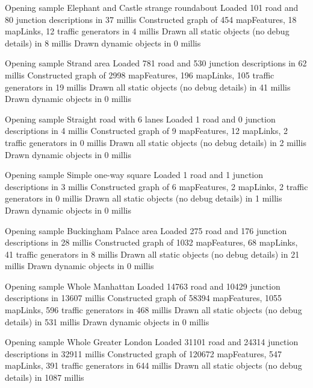 Opening sample Elephant and Castle strange roundabout
Loaded 101 road and 80 junction descriptions in 37 millis
Constructed graph of 454 mapFeatures, 18 mapLinks, 12 traffic generators in 4 millis
Drawn all static objects (no debug details) in 8 millis
Drawn dynamic objects in 0 millis


Opening sample Strand area
Loaded 781 road and 530 junction descriptions in 62 millis
Constructed graph of 2998 mapFeatures, 196 mapLinks, 105 traffic generators in 19 millis
Drawn all static objects (no debug details) in 41 millis
Drawn dynamic objects in 0 millis


Opening sample Straight road with 6 lanes
Loaded 1 road and 0 junction descriptions in 4 millis
Constructed graph of 9 mapFeatures, 12 mapLinks, 2 traffic generators in 0 millis
Drawn all static objects (no debug details) in 2 millis
Drawn dynamic objects in 0 millis

Opening sample Simple one-way square
Loaded 1 road and 1 junction descriptions in 3 millis
Constructed graph of 6 mapFeatures, 2 mapLinks, 2 traffic generators in 0 millis
Drawn all static objects (no debug details) in 1 millis
Drawn dynamic objects in 0 millis

Opening sample Buckingham Palace area
Loaded 275 road and 176 junction descriptions in 28 millis
Constructed graph of 1032 mapFeatures, 68 mapLinks, 41 traffic generators in 8 millis
Drawn all static objects (no debug details) in 21 millis
Drawn dynamic objects in 0 millis

Opening sample Whole Manhattan
Loaded 14763 road and 10429 junction descriptions in 13607 millis
Constructed graph of 58394 mapFeatures, 1055 mapLinks, 596 traffic generators in 468 millis
Drawn all static objects (no debug details) in 531 millis
Drawn dynamic objects in 0 millis

Opening sample Whole Greater London
Loaded 31101 road and 24314 junction descriptions in 32911 millis
Constructed graph of 120672 mapFeatures, 547 mapLinks, 391 traffic generators in 644 millis
Drawn all static objects (no debug details) in 1087 millis


